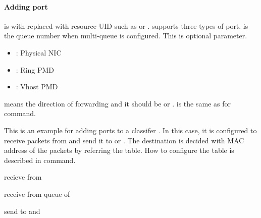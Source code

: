 \documentclass[a4paper,11pt,openany,oneside,english]{sphinxmanual}
\begin{document}
\paragraph{Adding port}
\label{\detokenize{commands/secondary/spp_vf:adding-port}}
\begin{sphinxVerbatim}[commandchars=\\\{\},formatcom=\footnotesize]
\end{sphinxVerbatim}

 is with replaced with resource UID such as  or
.  supports three types of port.
 is the queue number when multi-queue is configured.
This is optional parameter.
\begin{itemize}
\item {} 
 : Physical NIC

\item {} 
 : Ring PMD

\item {} 
 : Vhost PMD

\end{itemize}

 means the direction of forwarding and it should be  or .
 is the same as for  command.

This is an example for adding ports to a classifer . In this case,
it is configured to receive packets from  and send it to 
or . The destination is decided with MAC address of the packets
by referring the table. How to configure the table is described in
{\hyperref[\detokenize{commands/secondary/spp_vf:commands-spp-vf-classifier-table}]{}} command.

\begin{sphinxVerbatim}[commandchars=\\\{\},formatcom=\footnotesize]
 recieve from 

 receive from queue  of 

 send to  and 
\end{sphinxVerbatim}
\end{document}
